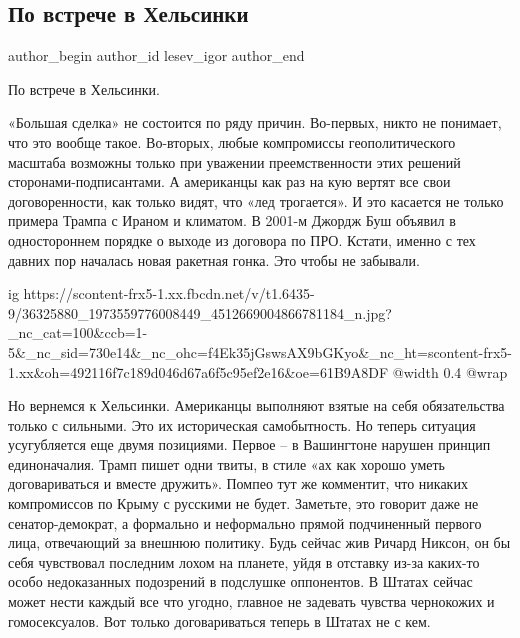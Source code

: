  
 
 
 
 
 
\subsection{По встрече в Хельсинки}
\label{sec:29_06_2018.fb.lesev_igor.1.vstrecha_v_helsinki}
 
\ifcmt
 author_begin
   author_id lesev_igor
 author_end
\fi

По встрече в Хельсинки.

«Большая сделка» не состоится по ряду причин. Во-первых, никто не понимает, что
это вообще такое. Во-вторых, любые компромиссы геополитического масштаба
возможны только при уважении преемственности этих решений
сторонами-подписантами. А американцы как раз на кую вертят все свои
договоренности, как только видят, что «лед трогается». И это касается не только
примера Трампа с Ираном и климатом. В 2001-м Джордж Буш объявил в одностороннем
порядке о выходе из договора по ПРО. Кстати, именно с тех давних пор началась
новая ракетная гонка. Это чтобы не забывали.

\ifcmt
  ig https://scontent-frx5-1.xx.fbcdn.net/v/t1.6435-9/36325880_1973559776008449_4512669004866781184_n.jpg?_nc_cat=100&ccb=1-5&_nc_sid=730e14&_nc_ohc=f4Ek35jGswsAX9bGKyo&_nc_ht=scontent-frx5-1.xx&oh=492116f7c189d046d67a6f5c95ef2e16&oe=61B9A8DF
  @width 0.4
  @wrap 
\fi

Но вернемся к Хельсинки. Американцы выполняют взятые на себя обязательства
только с сильными. Это их историческая самобытность. Но теперь ситуация
усугубляется еще двумя позициями. Первое – в Вашингтоне нарушен принцип
единоначалия. Трамп пишет одни твиты, в стиле «ах как хорошо уметь
договариваться и вместе дружить». Помпео тут же комментит, что никаких
компромиссов по Крыму с русскими не будет. Заметьте, это говорит даже не
сенатор-демократ, а формально и неформально прямой подчиненный первого лица,
отвечающий за внешнюю политику. Будь сейчас жив Ричард Никсон, он бы себя
чувствовал последним лохом на планете, уйдя в отставку из-за каких-то особо
недоказанных подозрений в подслушке оппонентов. В Штатах сейчас может нести
каждый все что угодно, главное не задевать чувства чернокожих и гомосексуалов.
Вот только договариваться теперь в Штатах не с кем.

